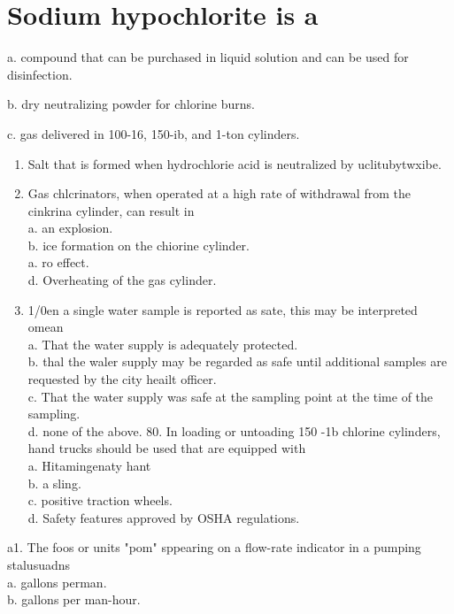\documentclass[10pt]{article}
\begin{document}
\section{Sodium hypochlorite is a}
a. compound that can be purchased in liquid solution and can be used for disinfection.

b. dry neutralizing powder for chlorine burns.

c. gas delivered in 100-16, 150-ib, and 1-ton cylinders.

\begin{enumerate}
  \item Salt that is formed when hydrochlorie acid is neutralized by uclitubytwxibe.

  \item Gas chlcrinators, when operated at a high rate of withdrawal from the cinkrina cylinder, can result in\\
a. an explosion.\\
b. ice formation on the chiorine cylinder.\\
a. ro effect.\\
d. Overheating of the gas cylinder.

  \item 1/0en a single water sample is reported as sate, this may be interpreted omean\\
a. That the water supply is adequately protected.\\
b. thal the waler supply may be regarded as safe until additional samples are requested by the city heailt officer.\\
c. That the water supply was safe at the sampling point at the time of the sampling.\\
d. none of the above. 80. In loading or untoading 150 -1b chlorine cylinders, hand trucks should be used that are equipped with\\
a. Hitamingenaty hant\\
b. a sling.\\
c. positive traction wheels.\\
d. Safety features approved by OSHA regulations.

\end{enumerate}

a1. The foos or units "pom" sppearing on a flow-rate indicator in a pumping stalusuadns\\
a. gallons perman.\\
b. gallons per man-hour.
\end{document}
